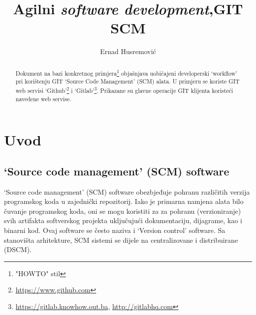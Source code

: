 \documentclass[times, utf8, seminar]{fit}
\begin{document}



\title{Agilni \emph{software development},\newline GIT SCM}

\author{Ernad Husremović}


\maketitle

\tableofcontents

\newpage

\begin{abstract}

Dokument na bazi konkretnog primjera\footnote{"HOWTO" stil} objašnjava uobičajeni developerski `workflow' pri korištenju GIT `Source Code Management' (SCM) alata. 
U primjeru se koriste GIT web servisi `Github'\footnote{\url{https://www.github.com}} i `Gitlab'\footnote{\url{https://gitlab.knowhow.out.ba}, \url{http://gitlabhq.com}}.
Prikazane su glavne operacije GIT klijenta koristeći navedene web servise.


\end{abstract}


\chapter{Uvod}

\section{`Source code management' (SCM) software}

`Source code management' (SCM) software obezbjeđuje pohranu različitih verzija programskog koda u zajednički repozitorij. 
Iako je primarna namjena alata bilo čuvanje programskog koda, oni se mogu koristiti za za pohranu (verzioniranje) svih artifakta softverskog projekta uključujući dokumentaciju, dijagrame, kao i  binarni kod. Ovaj software se često naziva i `Version control' software.
Sa stanovišta arhitekture, SCM sistemi se dijele na centralizovane i distribuirane (DSCM).
\end{document}

